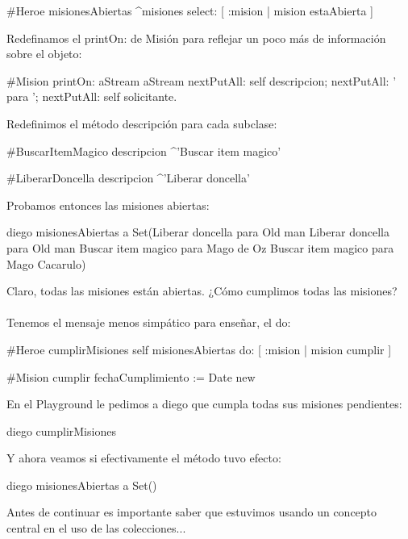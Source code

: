 \documentclass[a4paper,12pt]{book}
\begin{document}
\begin{code}
#Heroe
misionesAbiertas
  ^misiones select: [ :mision | mision estaAbierta ] 
\end{code}

Redefinamos el printOn: de Misión para reflejar un poco más de información sobre el objeto:

\begin{code}
#Mision
printOn: aStream
   aStream nextPutAll: self descripcion;
		nextPutAll: ' para ';
		nextPutAll: self solicitante.
\end{code}

Redefinimos el método descripción para cada subclase:

\begin{code}
#BuscarItemMagico
descripcion
  ^'Buscar item magico'

#LiberarDoncella
descripcion
  ^'Liberar doncella'
\end{code}
  
Probamos entonces las misiones abiertas:
\begin{code}
diego misionesAbiertas
   a Set(Liberar doncella para Old man 
         Liberar doncella para Old man 
         Buscar item magico para Mago de Oz 
         Buscar item magico para Mago Cacarulo)
\end{code}

Claro, todas las misiones están abiertas. ¿Cómo cumplimos todas las misiones?
\\
\\
Tenemos el mensaje menos simpático para enseñar, el do:

\begin{code}
#Heroe
cumplirMisiones
  self misionesAbiertas do: [ :mision | mision cumplir ] 
  
#Mision
cumplir
  fechaCumplimiento := Date new
\end{code}

En el Playground le pedimos a diego que cumpla todas sus misiones pendientes:

\begin{code}
diego cumplirMisiones
\end{code}

Y ahora veamos si efectivamente el método tuvo efecto:
\begin{code}
diego misionesAbiertas
      a Set()
\end{code}

Antes de continuar es importante saber que estuvimos usando un concepto central en el uso de las colecciones...
\\
\end{document}
